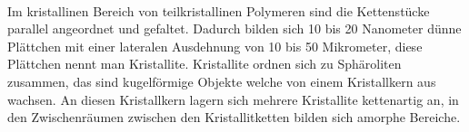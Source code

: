 \documentclass[11pt,a4paper]{article}
\numberwithin{equation}{section}
\numberwithin{figure}{section}
\begin{document}
\\
\begin{addmargin}[25pt]{0pt}
Im kristallinen Bereich von teilkristallinen Polymeren sind die Kettenstücke parallel angeordnet und gefaltet. Dadurch bilden sich 10 bis 20 Nanometer dünne Plättchen mit einer lateralen Ausdehnung von 10 bis 50 Mikrometer, diese Plättchen nennt man Kristallite. Kristallite ordnen sich zu Sphäroliten zusammen, das sind kugelförmige Objekte welche von einem Kristallkern aus wachsen. An diesen Kristallkern lagern sich mehrere Kristallite kettenartig an, in den Zwischenräumen zwischen den Kristallitketten bilden sich amorphe Bereiche. \\
\end{addmargin}
\end{document}
